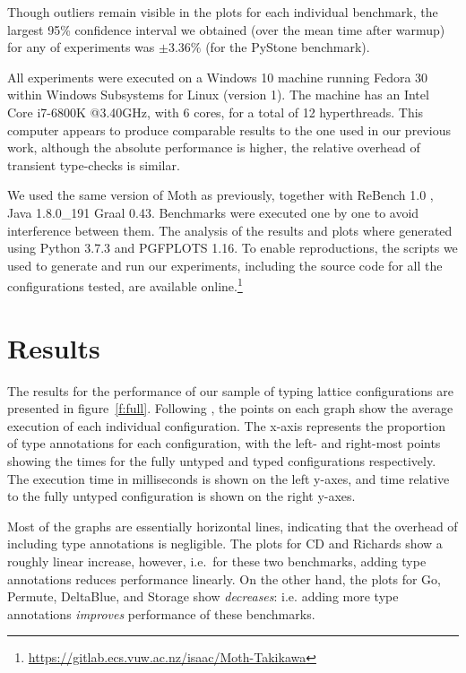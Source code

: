 \documentclass[sigplan,10pt,review,screen]{acmart}\settopmatter{printfolios=true}
\begin{document}
Though outliers remain visible in the plots for each individual benchmark, the largest 95\% confidence interval we obtained (over the mean time after warmup) for any of experiments was $\pm3.36\%$ (for the PyStone benchmark).

All experiments were executed on a Windows 10 machine
running Fedora 30 within Windows Subsystems for Linux (version 1). The machine has an Intel Core i7-6800K @3.40GHz, with 6 cores, for a total of 12 hyperthreads. This computer appears to produce comparable results to the one used in our previous work, although the absolute performance is higher, the relative overhead of transient type-checks is similar.

We used the same version of Moth as previously, together with ReBench 1.0 \citep{ReBench:2018}, Java 1.8.0\_191 Graal 0.43. Benchmarks were executed one by one to avoid interference between them. The analysis of the results and plots where generated using Python 3.7.3 and PGFPLOTS 1.16. To enable reproductions, the scripts we used to generate and run our experiments, including the source code for all the configurations tested, are available online.\footnote{\url{https://gitlab.ecs.vuw.ac.nz/isaac/Moth-Takikawa}}

\section{Results}
\label{s-overall}

\begin{figure*}
	
	\caption{Graphs of (at most) 102 configurations in the typing lattices for each benchmark. Time is measured as the mean of the 351\textsuperscript{st} to the 1,000\textsuperscript{th} benchmark iteration under a single invocation of Moth (lower is better).}
	\label{f:full}
\end{figure*}
The results for the performance of our sample of typing lattice configurations are presented in figure~\ref{f:full}. Following \cite{vitousek-transient-arXive-2019}, the points on each graph show the average execution of each individual configuration. The x-axis represents the proportion of type annotations for each configuration, with the left- and right-most points showing the times for the fully untyped and typed configurations respectively. The execution time in milliseconds is shown on the left y-axes, and time relative to the fully untyped configuration is shown on the right y-axes.

Most of the graphs are essentially horizontal lines, indicating that the overhead of including type annotations is negligible. The plots for CD and Richards show a roughly linear increase, however, i.e.\ for these two benchmarks, adding type annotations reduces performance linearly. On the other hand, the plots for Go, Permute, DeltaBlue, and Storage show \emph{decreases}: i.e. adding more type annotations \emph{improves} performance of these benchmarks.
\end{document}
